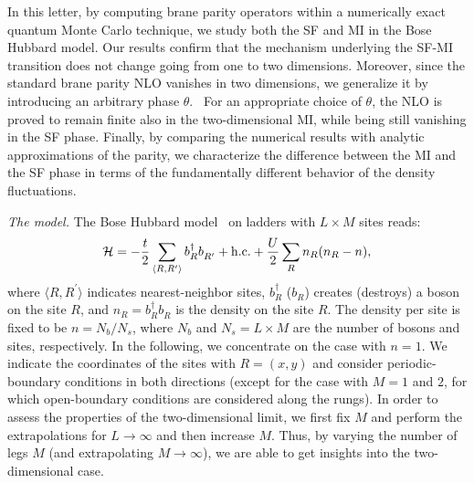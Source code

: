 \documentclass[aps,prb,floatfix,twocolumn,amsmath,amssymb]{revtex4}
\begin{document}
In this letter, by computing brane parity operators within a numerically exact quantum Monte Carlo technique, we study both the 
SF and MI in the Bose Hubbard model. Our results confirm that the mechanism underlying the SF-MI transition does not change
going from one to two dimensions. Moreover, since the standard brane parity NLO vanishes in two dimensions, we generalize it by 
introducing an arbitrary phase $\theta$.~\cite{Qin2003} For an appropriate choice of $\theta$, the NLO is proved to remain finite 
also in the two-dimensional MI, while being still vanishing in the SF phase. Finally, by comparing the numerical results with 
analytic approximations of the parity, we characterize the difference between the MI and the SF phase in terms of the fundamentally 
different behavior of the density fluctuations.

{\it The model.} The Bose Hubbard model~\cite{BHM} on ladders with $L \times M$ sites reads:
\begin{equation}\label{eq:bosehubbard}
{\cal H} = -\frac{t}{2} \sum_{\langle R,R^\prime \rangle} b^\dag_{R} b^{\phantom{\dagger}}_{R^\prime} 
+ {\rm h.c.} + \frac{U}{2} \sum_R n_R (n_R-n),
\end{equation}
where $\langle R,R^\prime \rangle$ indicates nearest-neighbor sites, $b^\dag_R$ ($b^{\phantom{\dagger}}_R$) creates (destroys) a 
boson on the site $R$, and $n_R=b^\dag_R b^{\phantom{\dagger}}_R$ is the density on the site $R$. The density per site is fixed to 
be $n=N_b/N_s$, where $N_b$ and $N_s=L \times M$ are the number of bosons and sites, respectively. In the following, we concentrate
on the case with $n=1$. We indicate the coordinates of the sites with $R=(x,y)$ and consider periodic-boundary conditions in both 
directions (except for the case with $M=1$ and $2$, for which open-boundary conditions are considered along the rungs). In order to 
assess the properties of the two-dimensional limit, we first fix $M$ and perform the extrapolations for $L \to \infty$ and then 
increase $M$. Thus, by varying the number of legs $M$ (and extrapolating $M \to \infty$), we are able to get insights into the 
two-dimensional case. 
 
\end{document}
